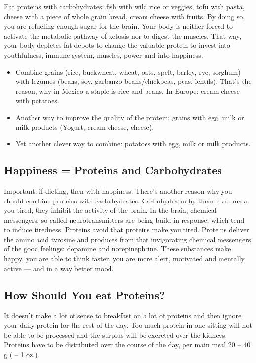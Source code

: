 \documentclass[../main.tex]{subfiles}
\begin{document}
    Eat proteins with carbohydrates: fish with wild rice or veggies, tofu with pasta, cheese with a piece of whole grain bread,
    cream cheese with fruits.
    By doing so, you are refueling enough sugar for the brain.
    Your body is neither forced to activate the metabolic pathway of ketosis nor to digest the muscles.
    That way, your body depletes fat depots to change the valuable protein to invest
    into youthfulness, immune system, muscles, power und into happiness.
    \begin{itemize}
    \item Combine grains (rice, buckwheat, wheat, oats, spelt, barley, rye, sorghum) with legumes (beans, soy, garbanzo beans/chickpeas, peas, lentils).
      That's the reason, why in Mexico a staple is rice and beans. In Europe: cream cheese with potatoes.
    \item Another way to improve the quality of the protein: grains with egg, milk or milk products (Yogurt, cream cheese, cheese).
      \item Yet another clever way to combine: potatoes with egg, milk or milk products.
      \end{itemize}

      \subsection{Happiness = Proteins and Carbohydrates}

      Important: if dieting, then with  happiness.
      There's another reason why you should combine proteins with carbohydrates.
      Carbohydrates by themselves make you tired, they inhibit the activity of the brain.
      In the brain, chemical messengers, so called neurotransmitters are being build in response, which tend to induce tiredness.
      Proteins avoid that proteins make you tired.
      Proteins deliver the amino acid tyrosine and produces from that invigorating chemical messengers of the good feelings:
      dopamine and norepinephrine.
      These substances make happy, you are able to think faster, you are more alert, motivated and mentally active --- and in a way better mood.

      \subsection{How Should You eat Proteins?}

      It doesn't make a lot of sense to breakfast on a lot of proteins and then ignore your daily protein for the rest of the day.
      Too much protein in one sitting will not be able to be processed and the surplus will be excreted over the kidneys.
      Proteins have to be distributed over the course of the day, per main meal 20 -- 40 g ( -- 1 oz.).
\end{document}
